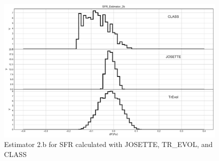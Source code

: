 \begin{figure}[h]
	\begin{center}
		\includegraphics[width = 0.99\textwidth]{../../Feature_1/RAW_DATA/FIG/SFR_Estimator_2b.pdf}
		\caption{Estimator 2.b for \gls{SFR} calculated with JOSETTE, TR\_EVOL, and CLASS}
		\label{fig:Est2_SFR}
	\end{center}
\end{figure}
